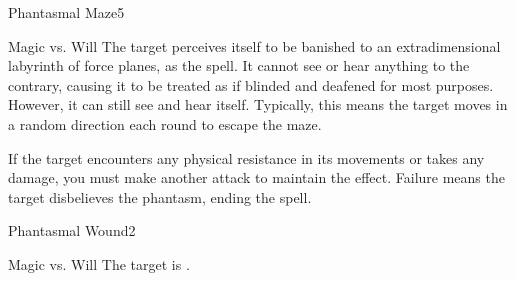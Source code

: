 \begin{spellfooter}
\begin{spellsection}{Phantasmal Maze}{5}
    \begin{spellheader}
    \end{spellheader}
    \begin{spellcontent}
        \begin{spelltargetinginfo}
        \end{spelltargetinginfo}
        \begin{spelleffects}
            \begin{spellattack}{Magic vs. Will}
                \spellsuccess The target perceives itself to be banished to an extradimensional labyrinth of force planes, as the  spell. It cannot see or hear anything to the contrary, causing it to be treated as if blinded and deafened for most purposes. However, it can still see and hear itself. Typically, this means the target moves in a random direction each round to escape the maze.

                If the target encounters any physical resistance in its movements or takes any damage, you must make another attack to maintain the effect. Failure means the target disbelieves the phantasm, ending the spell.
            \end{spellattack}
            \spelldur \durmed
        \end{spelleffects}
    \end{spellcontent}
    \begin{spellfooter}
    \end{spellfooter}
\end{spellsection}

\begin{spellsection}{Phantasmal Wound}{2}
    \begin{spellheader}
    \end{spellheader}
    \begin{spellcontent}
        \begin{spelltargetinginfo}
        \end{spelltargetinginfo}
        \begin{spelleffects}
            \begin{spellattack}{Magic vs. Will}
                \spellsuccess The target is \sickened.


\end{spellattack}
\end{spelleffects}
\end{spellcontent}
\end{spellsection}
\end{spellfooter}
